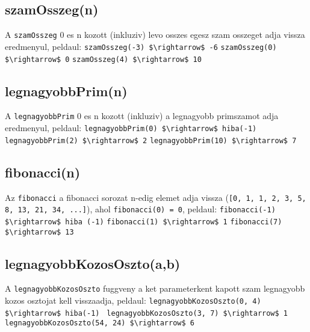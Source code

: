 \documentclass{article}
\begin{document}
\subsection{szamOsszeg(n)}
A \lstinline{szamOsszeg} 0 es n kozott (inkluziv) levo osszes egesz szam osszeget adja vissza eredmenyul, peldaul:\newline
\lstinline[mathescape]{szamOsszeg(-3) $\rightarrow$ -6}\newline
\lstinline[mathescape]{szamOsszeg(0) $\rightarrow$ 0}\newline
\lstinline[mathescape]{szamOsszeg(4) $\rightarrow$ 10}\newline

\subsection{legnagyobbPrim(n)}
A \lstinline{legnagyobbPrim} 0 es n kozott (inkluziv) a legnagyobb primszamot adja eredmenyul, peldaul:\newline
\lstinline[mathescape]{legnagyobbPrim(0) $\rightarrow$ hiba(-1)}\newline
\lstinline[mathescape]{legnagyobbPrim(2) $\rightarrow$ 2}\newline
\lstinline[mathescape]{legnagyobbPrim(10) $\rightarrow$ 7}\newline

\newpage
\subsection{fibonacci(n)}
Az \lstinline{fibonacci} a fibonacci sorozat n-edig elemet adja vissza \newline (\lstinline{[0, 1, 1, 2, 3, 5, 8, 13, 21, 34, ...]}), ahol \lstinline|fibonacci(0) = 0|, peldaul: \newline
\lstinline[mathescape]{fibonacci(-1) $\rightarrow$ hiba (-1)}\newline
\lstinline[mathescape]{fibonacci(1) $\rightarrow$ 1}\newline
\lstinline[mathescape]{fibonacci(7) $\rightarrow$ 13}\newline

\subsection{legnagyobbKozosOszto(a,b)}

A \lstinline{legnagyobbKozosOszto} fuggveny a ket parameterkent kapott szam legnagyobb kozos osztojat kell visszaadja, peldaul:\newline
\lstinline[mathescape]{legnagyobbKozosOszto(0, 4) $\rightarrow$ hiba(-1) }\newline
\lstinline[mathescape]{legnagyobbKozosOszto(3, 7) $\rightarrow$ 1}\newline
\lstinline[mathescape]{legnagyobbKozosOszto(54, 24) $\rightarrow$ 6}\newline
\end{document}
